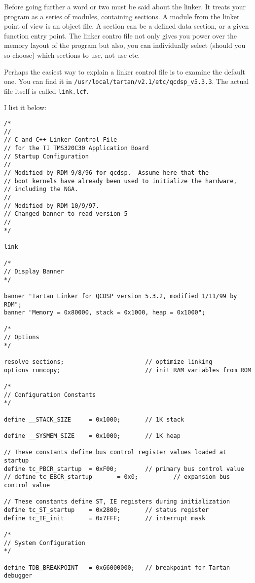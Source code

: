 Before going further a word or two must be said about the linker. It
treats your program as a series of modules, containing sections. A module
from the linker point of view is an object file. A section can be 
a defined data section, or a given function entry point. The linker
contro file not only gives you power over the memory layout of the 
program but also, you can individually select (should you so choose)
which sections to use, not use etc.

Perhaps the easiest way to explain a linker control file is to examine
the default one. You can find it in {\tt /usr/local/tartan/v2.1/etc/qcdsp\_v5.3.3}. The actual file itself is called {\tt link.lcf}.

I list it below:
{\scriptsize
\begin{verbatim}
/*
//
// C and C++ Linker Control File
// for the TI TMS320C30 Application Board
// Startup Configuration
//
// Modified by RDM 9/8/96 for qcdsp.  Assume here that the
// boot kernels have already been used to initialize the hardware,
// including the NGA.
//
// Modified by RDM 10/9/97.
// Changed banner to read version 5 
//
*/

link  

/*
// Display Banner
*/

banner "Tartan Linker for QCDSP version 5.3.2, modified 1/11/99 by RDM";
banner "Memory = 0x80000, stack = 0x1000, heap = 0x1000";

/*
// Options
*/

resolve sections;                       // optimize linking
options romcopy;                        // init RAM variables from ROM

/*
// Configuration Constants
*/

define __STACK_SIZE     = 0x1000;       // 1K stack

define __SYSMEM_SIZE    = 0x1000;       // 1K heap

// These constants define bus control register values loaded at startup
define tc_PBCR_startup  = 0xF00;        // primary bus control value
// define tc_EBCR_startup       = 0x0;          // expansion bus control value

// These constants define ST, IE registers during initialization
define tc_ST_startup    = 0x2800;       // status register
define tc_IE_init       = 0x7FFF;       // interrupt mask

/*
// System Configuration
*/

define TDB_BREAKPOINT   = 0x66000000;   // breakpoint for Tartan debugger


\end{verbatim}}
